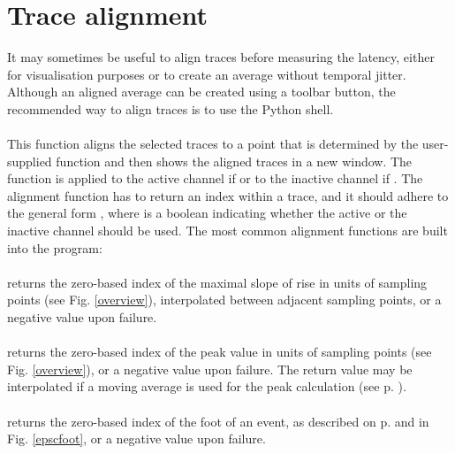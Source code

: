 \section{Trace alignment}
It may sometimes be useful to align traces before measuring the latency, either for visualisation purposes or to create an average without temporal jitter. Although an aligned average can be created using a toolbar button, the recommended way to align traces is to use the Python shell. \smallskip \\
\\
This function aligns the selected traces to a point that is determined by the user-supplied function  and then shows the aligned traces in a new window. The  function is applied to the active channel if  or to the inactive channel if . The alignment function has to return an index within a trace, and it should adhere to the general form , where  is a boolean indicating whether the active or the inactive channel should be used. The most common alignment functions are built into the program: \smallskip \\
\\
\noindent returns the zero-based index of the maximal slope of rise in units of sampling points (see Fig. \ref{overview}), interpolated between adjacent sampling points, or a negative value upon failure.\smallskip\\
\\
\noindent returns the zero-based index of the peak value in units of sampling points (see Fig. \ref{overview}), or a negative value upon failure. The return value may be interpolated if a moving average is used for the peak calculation (see p. \pageref{peakmovingaverage}).\smallskip\\
\\
\noindent returns the zero-based index of the foot of an event, as described on p. \pageref{foot} and in Fig. \ref{epscfoot}, or a negative value upon failure.\smallskip\\
\\
